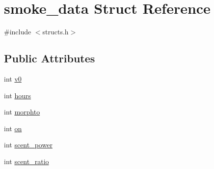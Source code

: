 \hypertarget{structsmoke__data}{\section{smoke\-\_\-data Struct Reference}
\label{structsmoke__data}
}


{\ttfamily \#include $<$structs.\-h$>$}

\subsection*{Public Attributes}
\begin{DoxyCompactItemize}
\item 
int \hyperlink{structsmoke__data_ab9e0ec5cf6432e73e937d3fec4c694df}{v0}
\item 
int \hyperlink{structsmoke__data_aaf3866b012d5294aa2e6100f71e6815f}{hours}
\item 
int \hyperlink{structsmoke__data_a8eadb9e965e93cd2b445df5a07947597}{morphto}
\item 
int \hyperlink{structsmoke__data_a72d69564d6a635fc5a4af9bbbe958dcd}{on}
\item 
int \hyperlink{structsmoke__data_a1357ca79de903215e0a4a8ea74d76779}{scent\-\_\-power}
\item 
int \hyperlink{structsmoke__data_af58080ad5cfb641f831c614418ecf7c3}{scent\-\_\-ratio}
\end{DoxyCompactItemize}


